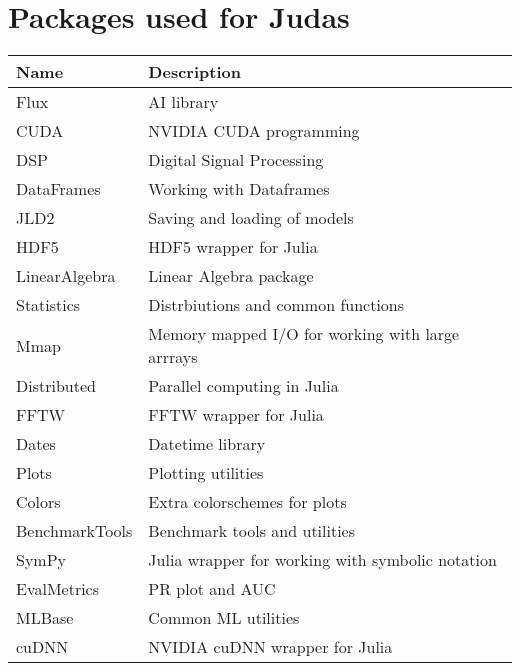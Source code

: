 \chapter{Packages used for Judas}
\label{app:packages}

\begin{table}[h]
\begin{tabular}{|l|l|}
\hline
\textbf{Name}  & \textbf{Description}                             \\ \hline
Flux           & AI library                                       \\ \hline
CUDA           & NVIDIA CUDA programming                          \\ \hline
DSP            & Digital Signal Processing                        \\ \hline
DataFrames     & Working with Dataframes                          \\ \hline
JLD2           & Saving and loading of models                     \\ \hline
HDF5           & HDF5 wrapper for Julia                           \\ \hline
LinearAlgebra  & Linear Algebra package                           \\ \hline
Statistics     & Distrbiutions and common functions               \\ \hline
Mmap           & Memory mapped I/O for working with large arrrays \\ \hline
Distributed    & Parallel computing in Julia                      \\ \hline
FFTW           & FFTW wrapper for Julia                           \\ \hline
Dates          & Datetime library                                 \\ \hline
Plots          & Plotting utilities                               \\ \hline
Colors         & Extra colorschemes for plots                     \\ \hline
BenchmarkTools & Benchmark tools and utilities                    \\ \hline
SymPy          & Julia wrapper for working with symbolic notation \\ \hline
EvalMetrics    & PR plot and AUC                                  \\ \hline
MLBase         & Common ML utilities                              \\ \hline
cuDNN          & NVIDIA cuDNN wrapper for Julia                   \\ \hline
\end{tabular}
\end{table}